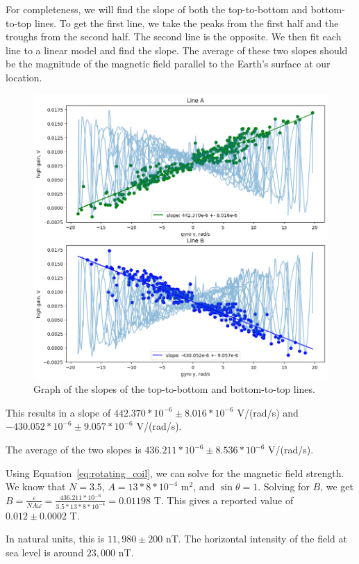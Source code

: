 \documentclass[11pt]{article}
\begin{document}
    For completeness, we will find the slope of both the top-to-bottom and bottom-to-top lines.
    To get the first line, we take the peaks from the first half and the troughs from the second half.
    The second line is the opposite.
    We then fit each line to a linear model and find the slope.
    The average of these two slopes should be the magnitude of the magnetic field parallel to the Earth's surface at our location.

    \begin{figure}[H]
        \centering
        \includegraphics[width=0.8\linewidth]{resources/images/part 1 slopes}
        \caption{Graph of the slopes of the top-to-bottom and bottom-to-top lines.}
        \label{fig:part_1_slopes}
    \end{figure}

    This results in a slope of $442.370*10^{-6} \pm 8.016*10^{-6}$ V/(rad/s) and $-430.052*10^{-6} \pm 9.057*10^{-6}$ V/(rad/s).

    The average of the two slopes is $436.211*10^{-6} \pm 8.536*10^{-6}$ V/(rad/s).

    Using Equation~\ref{eq:rotating_coil}, we can solve for the magnetic field strength.
    We know that $N = 3.5$, $A = 13*8*10^{-4}$ m$^2$, and $\sin\theta = 1$.
    Solving for $B$, we get $B = \frac{\varepsilon}{N A \omega} = \frac{436.211*10^{-6}}{3.5*13*8*10^{-4}} = 0.01198$ T.
    This gives a reported value of $0.012 \pm 0.0002$ T.

    In natural units, this is $11,980 \pm 200$ nT.
    The horizontal intensity of the field at sea level is around $23,000$ nT.
\end{document}
